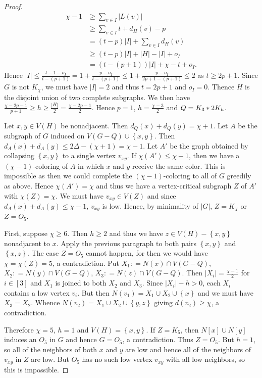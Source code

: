 \documentclass[12pt]{amsart}
\theoremstyle{plain}
\theoremstyle{definition}
\theoremstyle{remark}
\newcommand{\set}[1]{\left\{ #1 \right\}}
\newcommand{\card}[1]{\left|#1\right|}
\newcommand{\irange}[1]{\left[#1\right]}
\newcommand{\join}[2]{#1 \mbox{\hspace{2 pt}$\ast$\hspace{2 pt}} #2}
\newcommand{\DefinedAs}{\mathrel{\mathop:}=}
\begin{document}
\begin{proof}
\begin{align*}
	\chi - 1 &\geq \sum_{v \in I} \card{L(v)} \\
	&\geq \sum_{v \in I} t + d_H(v) - p \\
	&= (t-p)\card{I} + \sum_{v \in I} d_H(v) \\
	&\geq (t-p)\card{I} + \card{H} - \card{I} + o_I \\
	&= (t - (p + 1))\card{I} + \chi - t + o_I. 
\end{align*}
Hence $\card{I} \leq \frac{t-1 - o_I}{t - (p + 1)} = 1 +
\frac{p-o_I}{t-(p+1)} \leq 1 + \frac{p-o_I}{2p + 1 - (p+1)} \leq 2$ as $t \geq
2p + 1$.  Since $G$ is not $K_\chi$, we must
have $\card{I} = 2$ and thus $t = 2p + 1$ and $o_I = 0$.  Thence $H$ is the
disjoint union of two complete subgraphs.  We then have $\frac{\chi - 2p - 1}{p
+ 1} \geq h \geq \frac{\card{H}}{2} = \frac{\chi - 2p - 1}{2}$.  Hence $p =
1$, $h = \frac{\chi - 3}{2}$ and $Q = \join{K_3}{2K_h}$.

Let $x,y \in V(H)$ be nonadjacent.  Then $d_Q(x) + d_Q(y) = \chi + 1$.  Let $A$
be the subgraph of $G$ induced on $V(G - Q) \cup \set{x,y}$.  Then $d_A(x) + d_A(y) \leq 2\Delta - (\chi + 1) = \chi - 1$.  Let
$A'$ be the graph obtained by collapsing $\set{x, y}$ to a single vertex
$v_{xy}$. If $\chi(A') \leq \chi - 1$, then we have a $(\chi - 1)$-coloring of
$A$ in which $x$ and $y$ receive the same color.  This is impossible as then we could
complete the $(\chi - 1)$-coloring to all of $G$ greedily as above.  Hence
$\chi(A') = \chi$ and thus we have a vertex-critical subgraph $Z$ of $A'$ with
$\chi(Z) = \chi$.  We must have $v_{xy} \in V(Z)$ and since $d_A(x) + d_A(y)
\leq \chi - 1$, $v_{xy}$ is low.  Hence, by minimality of $\card{G}$, $Z =
K_\chi$ or $Z = O_5$.

First, suppose $\chi \geq 6$.  Then $h \geq 2$ and thus we have $z \in V(H) - \set{x, y}$ nonadjacent to $x$.  
Apply the previous paragraph to both pairs $\set{x, y}$ and $\set{x, z}$.  
The case $Z = O_5$ cannot happen, for then we would have $\chi = \chi(Z) = 5$, a contradiction.  
Put $X_1 \DefinedAs N(x) \cap V(G - Q)$, $X_2 \DefinedAs N(y) \cap V(G - Q)$, $X_3 \DefinedAs N(z) \cap V(G - Q)$.  
Then $\card{X_i} = \frac{\chi - 1}{2}$ for $i \in \irange{3}$ and $X_1$ is joined to both $X_2$ and $X_3$.  
Since $\card{X_i} - h > 0$, each $X_i$ contains a low vertex $v_i$.  But then
$N(v_1) = X_1 \cup X_2 \cup \set{x}$ and we must have $X_3 = X_2$. Whence $N(v_2) = X_1 \cup X_2 \cup \set{y, z}$ giving $d(v_2) \geq \chi$, a contradiction.

Therefore $\chi = 5$, $h = 1$ and $V(H) = \set{x, y}$.  If $Z = K_5$, then $N[x] \cup N[y]$ induces an $O_5$ in $G$ and hence $G = O_5$, a contradiction.  
Thus $Z = O_5$.  But $h = 1$, so all of the neighbors of both $x$ and $y$ are
low and hence all of the neighbors of $v_{xy}$ in $Z$ are low. But $O_5$ has no such low vertex $v_{xy}$ with all low neighbors, so this is impossible.
	\end{proof}
\end{document}
